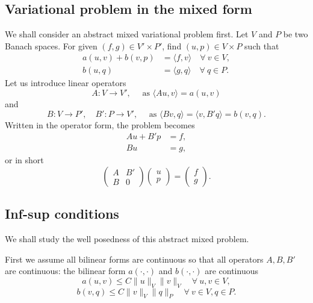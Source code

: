 \subsection{Variational problem in the mixed form}
We shall consider an abstract mixed variational
problem first. Let $V$ and $P$ be two Banach spaces. For given $(f, g)\in V'\times P'$, find
$(u, p)\in V \times P$ such that
\begin{align}
a(u, v)+ b(v, p) & =\langle f, v\rangle \quad \forall~v\in V, \label{abstractmixed1}\\
b(u, q) & =\langle g, q\rangle  \quad \forall~q\in P.\label{abstractmixed2}
\end{align}
Let us introduce linear operators
\[
A : V \to V',\quad \textrm{ as } \langle Au, v\rangle = a(u, v)
\]
and
\[
B: V\to P', \quad B' : P \to V',\quad \textrm{ as } \langle Bv, q\rangle = \langle v, B'q\rangle = b(v, q).
\]
Written in the operator form, the problem becomes
\begin{align}
Au+ B'p & =f, \label{abstractmixedoperator1}\\
Bu & =g, \label{abstractmixedoperator2}
\end{align}
or in short
\begin{equation*}%
\begin{pmatrix}
A &  B' \\
B & 0
\end{pmatrix}
\begin{pmatrix}
u \\ p
\end{pmatrix}
=
\begin{pmatrix}
f \\ g
\end{pmatrix}.
\end{equation*}


\subsection{Inf-sup conditions}

We shall study the well posedness of this abstract mixed problem.

First we assume all bilinear forms are continuous so that all operators $A, B, B'$ are
continuous: the bilinear form $a(\cdot, \cdot)$ and $b(\cdot, \cdot)$ are continuous
\begin{equation}\label{acontinuous}
a(u, v)\leq C\|u\|_V\|v\|_V \quad \forall~ u, v\in V,
\end{equation}
\begin{equation}\label{bcontinuous}
b(v, q)\leq C\|v\|_V\|q\|_P \quad \forall~ v\in V, q\in P.
\end{equation}

